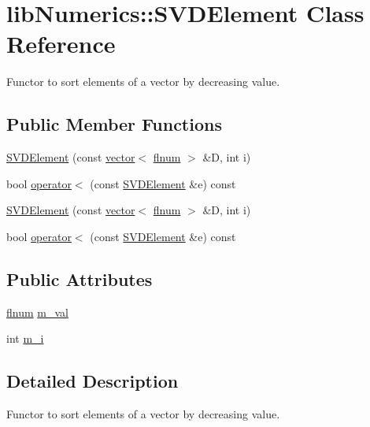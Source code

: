 \hypertarget{classlibNumerics_1_1SVDElement}{}\section{lib\+Numerics\+:\+:S\+V\+D\+Element Class Reference}
\label{classlibNumerics_1_1SVDElement}


Functor to sort elements of a vector by decreasing value.  


\subsection*{Public Member Functions}
\begin{DoxyCompactItemize}
\item 
\hyperlink{classlibNumerics_1_1SVDElement_a8e85a250ae4f90c93371a32da35d85a7}{S\+V\+D\+Element} (const \hyperlink{classlibNumerics_1_1vector}{vector}$<$ \hyperlink{namespacelibNumerics_ac94c07350f743d00e3dbcb33b6e974b0}{flnum} $>$ \&D, int i)
\item 
bool \hyperlink{classlibNumerics_1_1SVDElement_af10b80bd3448a6ee43bcd118375769f4}{operator$<$} (const \hyperlink{classlibNumerics_1_1SVDElement}{S\+V\+D\+Element} \&e) const 
\item 
\hyperlink{classlibNumerics_1_1SVDElement_a8e85a250ae4f90c93371a32da35d85a7}{S\+V\+D\+Element} (const \hyperlink{classlibNumerics_1_1vector}{vector}$<$ \hyperlink{namespacelibNumerics_ac94c07350f743d00e3dbcb33b6e974b0}{flnum} $>$ \&D, int i)
\item 
bool \hyperlink{classlibNumerics_1_1SVDElement_af10b80bd3448a6ee43bcd118375769f4}{operator$<$} (const \hyperlink{classlibNumerics_1_1SVDElement}{S\+V\+D\+Element} \&e) const 
\end{DoxyCompactItemize}
\subsection*{Public Attributes}
\begin{DoxyCompactItemize}
\item 
\hyperlink{namespacelibNumerics_ac94c07350f743d00e3dbcb33b6e974b0}{flnum} \hyperlink{classlibNumerics_1_1SVDElement_a0d3ae2a9e21d9c77748632a9a1172603}{m\+\_\+val}
\item 
int \hyperlink{classlibNumerics_1_1SVDElement_a575be34c77036ccf7d3a42173aac98c7}{m\+\_\+i}
\end{DoxyCompactItemize}


\subsection{Detailed Description}
Functor to sort elements of a vector by decreasing value. 

